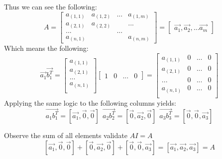 \documentclass[11pt]{article}
\theoremstyle{plain}
\begin{document}
Thus we can see the following:
\[
	A =
	\begin{bmatrix}
		a_{(1,1)} & a_{(1,2)} & ... & a_{(1,m)} \\
		a_{(2,1)} & a_{(2,2)} &     & ...       \\
		...       &           & ... &           \\
		a_{(n,1)} &           &     & a_{(n,m)}
	\end{bmatrix}
	= \begin{bmatrix}
		\vec{a_1}, \vec{a_2}, ... \vec{a_m}
	\end{bmatrix}
\]
Which means the following:
\[
	\vec{a_1}\vec{b_1^T} =
	\begin{bmatrix}
		a_{(1,1)} \\
		a_{(2,1)} \\
		...       \\
		a_{(n,1)} \\
	\end{bmatrix}
	\begin{bmatrix}
		1 & 0 & ... & 0
	\end{bmatrix}
	=
	\begin{bmatrix}
		a_{(1,1)} & 0 & ... & 0 \\
		a_{(2,1)} & 0 & ... & 0 \\
		...       & 0 & ... & 0 \\
		a_{(n,1)} & 0 & ... & 0 \\
	\end{bmatrix}
\]
Applying the same logic to the following columns yields:
\[
	\vec{a_1 b_1^T} = [\vec{a_1}, \vec{0}, \vec{0}]
	~~\vec{a_2 b_2^T} = [\vec{0}, \vec{a_2}, \vec{0}]
	~~\vec{a_3 b_3^T} = [\vec{0}, \vec{0}, \vec{a_3}]
\]

Observe the sum of all elements validate $AI=A$
\[
	[\vec{a_1}, \vec{0}, \vec{0}]
	+ [\vec{0}, \vec{a_2}, \vec{0}]
	+ [\vec{0}, \vec{0}, \vec{a_3}]
	= [ \vec{a_1}, \vec{a_2}, \vec{a_3}] = A
\]
\end{document}
